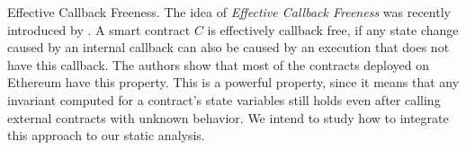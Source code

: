 \begin{paragraph}{Effective Callback Freeness.}
The idea of \emph{Effective Callback Freeness} was recently introduced by
\cite{Grossman}.
%
A smart contract $C$ is effectively callback free, if any state change caused
by an internal callback can also be caused by an execution that does not have this callback.
%
The authors show that most of the contracts deployed on Ethereum have this
property.
%
This is a powerful property, since it means that any invariant computed for a
contract's state variables still holds even after calling external contracts
with unknown behavior.
%
We intend to study how to integrate this approach to our static analysis.
\end{paragraph}

